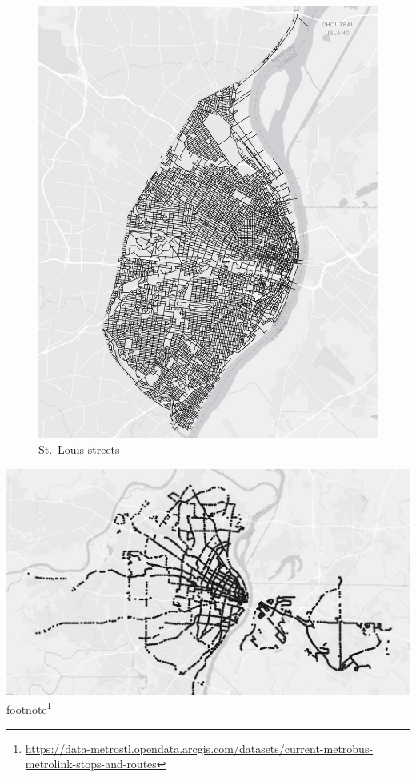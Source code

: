 \documentclass[
  krantz2]{krantz}
\begin{document}
\begin{figure}
\centering
\includegraphics{tmap-images/lines.png}
\caption{St.~Louis streets}
\end{figure}

\includegraphics{tmap-images/points.png}
footnote\footnote{\url{https://data-metrostl.opendata.arcgis.com/datasets/current-metrobus-metrolink-stops-and-routes}}
\end{document}

